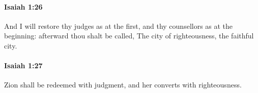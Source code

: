		\paragraph{Isaiah 1:26} %
			\label{ISAIAH-1-26}

			And I will restore thy judges as at the first, and thy counsellors as at the beginning: afterward thou shalt be called, The city of righteousness, the faithful city.


		\paragraph{Isaiah 1:27} %
			\label{ISAIAH-1-27}

			Zion shall be redeemed with judgment, and her converts with righteousness.


